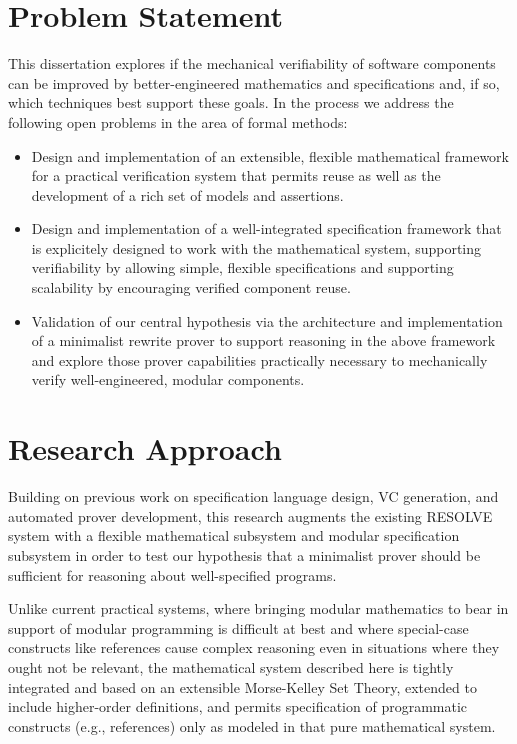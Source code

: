 \section{Problem Statement}
This dissertation explores if the mechanical verifiability of software components can be improved by better-engineered mathematics and specifications and, if so, which techniques best support these goals.  In the process we address the following open problems in the area of formal methods:

\begin{itemize}
\item Design and implementation of an extensible, flexible mathematical framework for a practical verification system that permits reuse as well as the development of a rich set of models and assertions.
\item Design and implementation of a well-integrated specification framework that is explicitely designed to work with the mathematical system, supporting verifiability by allowing simple, flexible specifications and supporting scalability by encouraging verified component reuse.
\item Validation of our central hypothesis via the architecture and implementation of a minimalist rewrite prover to support reasoning in the above framework and explore those prover capabilities practically necessary to mechanically verify well-engineered, modular components.
\end{itemize}

\section{Research Approach}
Building on previous work on specification language design, VC generation, and automated prover development, this research augments the existing RESOLVE\cite{sitariman1994component,Sit11} system with a flexible mathematical subsystem and modular specification subsystem in order to test our hypothesis that a minimalist prover should be sufficient for reasoning about well-specified programs.

Unlike current practical systems, where bringing modular mathematics to bear in support of modular programming is difficult at best and where special-case constructs like references cause complex reasoning even in situations where they ought not be relevant, the mathematical system described here is tightly integrated and based on an extensible Morse-Kelley Set Theory, extended to include higher-order definitions, and permits specification of programmatic constructs (e.g., references) only as modeled in that pure mathematical system.

